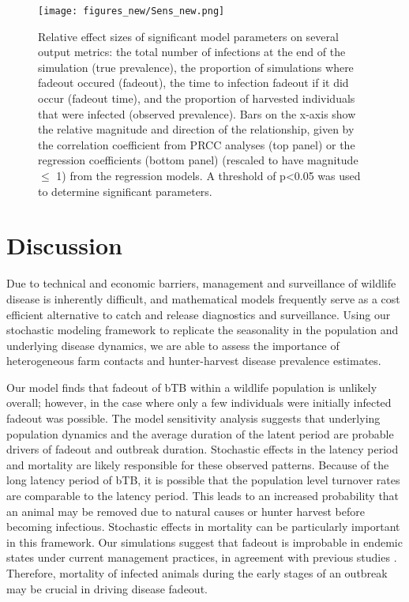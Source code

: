 \documentclass[number,preprint,review,12pt]{elsarticle}
\begin{document}
\begin{figure}[H]
    \centering
    \texttt{[image: figures\_new/Sens\_new.png]}
    \caption{Relative effect sizes of significant model parameters on several output metrics: the total number of infections at the end of the simulation (true prevalence), the proportion of simulations where fadeout occured (fadeout), the time to infection fadeout if it did occur (fadeout time), and the proportion of harvested individuals that were infected (observed prevalence). Bars on the x-axis show the relative magnitude and direction of the relationship, given by the correlation coefficient from PRCC analyses 
    (top panel) or the regression coefficients (bottom panel) (rescaled to have magnitude $\leq$ 1) from the regression models. A threshold of p<0.05 was used to determine significant parameters.}
    \label{sens_res}
\end{figure}


\section{Discussion}

Due to technical and economic barriers, management and surveillance of wildlife disease is inherently difficult, and mathematical models frequently serve as a cost efficient alternative to catch and release diagnostics and surveillance. Using our stochastic modeling framework to replicate the seasonality in the population and underlying disease dynamics, we are able to assess the importance of heterogeneous farm contacts and hunter-harvest disease prevalence estimates.

Our model finds that fadeout of bTB within a wildlife population is unlikely overall; however, in the case where only a few individuals were initially infected fadeout was possible. The model sensitivity analysis suggests that underlying population dynamics and the average duration of the latent period are probable drivers of fadeout and outbreak duration. Stochastic effects in the latency period and mortality are likely responsible for these observed patterns. Because of the long latency period of bTB, it is possible that the population level turnover rates are comparable to the latency period. This leads to an increased probability that an animal may be removed due to natural causes or hunter harvest before becoming infectious. Stochastic effects in mortality can be particularly important in this framework. Our simulations suggest that fadeout is improbable in endemic states under current management practices, in agreement with previous studies \citep{ramsey2014}. Therefore, mortality of infected animals during the early stages of an outbreak may be crucial in driving disease fadeout.
\end{document}
